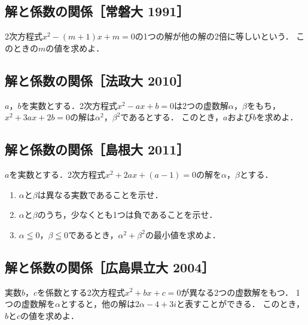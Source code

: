 \documentclass[../../ms_q.tex]{subfiles}
\begin{document}
\vspace{2cm}
\vfill

\subsection{解と係数の関係［常磐大 1991］}

2次方程式$x^2-(m+1)x+m=0$の1つの解が他の解の2倍に等しいという．
このときの$m$の値を求めよ．

\vspace{2cm}
\vfill

\subsection{解と係数の関係［法政大 2010］}

$a$，$b$を実数とする．2次方程式$x^2-ax+b=0$は2つの虚数解$\alpha$，$\beta$をもち，
$x^2+3ax+2b=0$の解は$\alpha^2$，$\beta^2$であるとする．
このとき，$a$および$b$を求めよ．

\vspace{2cm}
\vfill

\subsection{解と係数の関係［島根大 2011］}

$a$を実数とする．2次方程式$x^2+2ax+(a-1)=0$の解を$\alpha$，$\beta$とする．

\begin{enumerate}
    \item $\alpha$と$\beta$は異なる実数であることを示せ．
    \item $\alpha$と$\beta$のうち，少なくとも1つは負であることを示せ．
    \item $\alpha\leqq0$，$\beta\leqq0$であるとき，$\alpha^2+\beta^2$の最小値を求めよ．
\end{enumerate}

\vspace{2cm}
\vfill

\subsection{解と係数の関係［広島県立大 2004］}

実数$b$，$c$を係数とする2次方程式$x^2+bx+c=0$が異なる2つの虚数解をもつ．
1つの虚数解を$\alpha$とすると，他の解は$2\alpha-4+3i$と表すことができる．
このとき，$b$と$c$の値を求めよ．

\vspace{2cm}
\vfill
\end{document}
